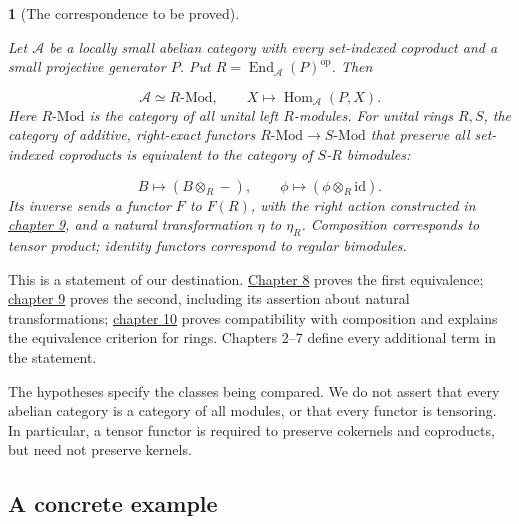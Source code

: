 \documentclass[11pt,a4paper]{article}
\newcommand{\mathheading}{}
\theoremstyle{plain}
\newtheorem*{plainstatement}{\mathheading}
\theoremstyle{definition}
\newenvironment{mathstatement}[3]{\renewcommand{\mathheading}{#1 #2}\begin{plainstatement}[#3]}{\end{plainstatement}}
\begin{document}
\begin{mathstatement}{Theorem}{1.1}{The correspondence to be proved}
\label{env-1-1}

Let \(\mathcal A\) be a locally small abelian category with every set-indexed coproduct and a small projective generator \(P\). Put \(R=\operatorname{End}_{\mathcal A}(P)^{\mathrm{op}}\). Then

\[\mathcal A\simeq R\text{-}\mathrm{Mod},\qquad X\longmapsto\operatorname{Hom}_{\mathcal A}(P,X).\] 
Here \(R\text{-}\mathrm{Mod}\) is the category of all unital left \(R\)-modules. For unital rings \(R,S\), the category of additive, right-exact functors \(R\text{-}\mathrm{Mod}\to S\text{-}\mathrm{Mod}\) that preserve all set-indexed coproducts is equivalent to the category of \(S\)-\(R\) bimodules:

\[B\longmapsto (B\otimes_R-),\qquad \phi\longmapsto (\phi\otimes_R\mathrm{id}).\] 
Its inverse sends a functor \(F\) to \(F(R)\), with the right action constructed in \hyperref[chapter-09]{chapter 9}, and a natural transformation \(\eta\) to \(\eta_R\). Composition corresponds to tensor product; identity functors correspond to regular bimodules.


\par{}\par

\end{mathstatement}
 
This is a statement of our destination. \hyperref[chapter-08]{Chapter 8} proves the first equivalence; \hyperref[chapter-09]{chapter 9} proves the second, including its assertion about natural transformations; \hyperref[chapter-10]{chapter 10} proves compatibility with composition and explains the equivalence criterion for rings. Chapters 2--7 define every additional term in the statement.

 
The hypotheses specify the classes being compared. We do not assert that every abelian category is a category of all modules, or that every functor is tensoring. In particular, a tensor functor is required to preserve cokernels and coproducts, but need not preserve kernels.

 
\subsection{A concrete example}
\end{document}
